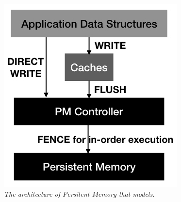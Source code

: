 \begin{figure}[t]
    \includegraphics[width=\columnwidth]{figures/nvm-architecture.jpg}
    \caption{\emph{The architecture of Persitent Memory that \checker models.}}
    \label{fig:nvm-architecture}
\end{figure}
